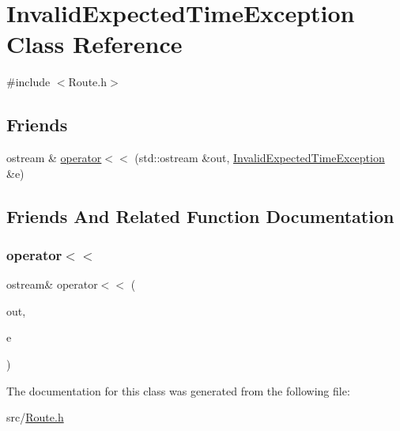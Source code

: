 \hypertarget{classInvalidExpectedTimeException}{}\section{Invalid\+Expected\+Time\+Exception Class Reference}
\label{classInvalidExpectedTimeException}


{\ttfamily \#include $<$Route.\+h$>$}

\subsection*{Friends}
\begin{DoxyCompactItemize}
\item 
ostream \& \hyperlink{classInvalidExpectedTimeException_ade435a7c98c3c9fa94bb27930e4874cf}{operator$<$$<$} (std\+::ostream \&out, \hyperlink{classInvalidExpectedTimeException}{Invalid\+Expected\+Time\+Exception} \&e)
\end{DoxyCompactItemize}


\subsection{Friends And Related Function Documentation}
\hypertarget{classInvalidExpectedTimeException_ade435a7c98c3c9fa94bb27930e4874cf}{}\label{classInvalidExpectedTimeException_ade435a7c98c3c9fa94bb27930e4874cf} 
\subsubsection{\texorpdfstring{operator$<$$<$}{operator<<}}
{\footnotesize\ttfamily ostream\& operator$<$$<$ (\begin{DoxyParamCaption}\item[{std\+::ostream \&}]{out,  }\item[{\hyperlink{classInvalidExpectedTimeException}{Invalid\+Expected\+Time\+Exception} \&}]{e }\end{DoxyParamCaption})\hspace{0.3cm}{\ttfamily [friend]}}



The documentation for this class was generated from the following file\+:\begin{DoxyCompactItemize}
\item 
src/\hyperlink{Route_8h}{Route.\+h}\end{DoxyCompactItemize}
